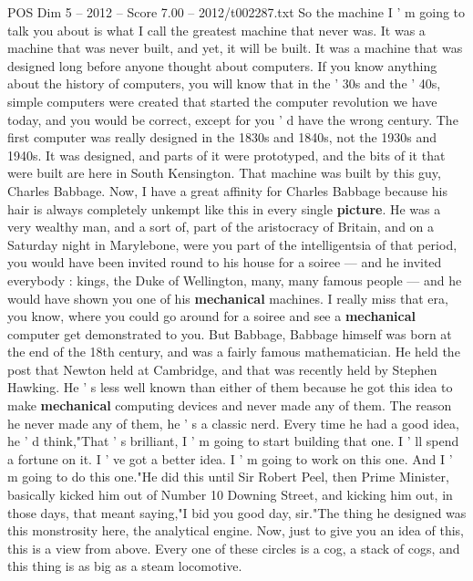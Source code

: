 \begin{textsample}{POS Dim 5 – 2012 – Score 7.00 – 2012/t002287.txt}  \label{ex:f5_pos_039}
So the machine I ' m going to talk you about is what I call the greatest machine that never was.
It was a machine that was never built, and yet, it will be built.
It was a machine that was designed long before anyone thought about computers.
If you know anything about the history of computers, you will know that in the ' 30s and the ' 40s, simple computers were created that started the computer revolution we have today, and you would be correct, except for you ' d have the wrong century.
The first computer was really designed in the 1830s and 1840s, not the 1930s and 1940s.
It was designed, and parts of it were prototyped, and the bits of it that were built are here in South Kensington.
That machine was built by this guy, Charles Babbage.
Now, I have a great affinity for Charles Babbage because his hair is always completely unkempt like this in every single \textbf{picture}.
He was a very wealthy man, and a sort of, part of the aristocracy of Britain, and on a Saturday night in Marylebone, were you part of the intelligentsia of that period, you would have been invited round to his house for a soiree — and he invited everybody : kings, the Duke of Wellington, many, many famous people — and he would have shown you one of his \textbf{mechanical} machines.
I really miss that era, you know, where you could go around for a soiree and see a \textbf{mechanical} computer get demonstrated to you.
But Babbage, Babbage himself was born at the end of the 18th century, and was a fairly famous mathematician.
He held the post that Newton held at Cambridge, and that was recently held by Stephen Hawking.
He ' s less well known than either of them because he got this idea to make \textbf{mechanical} computing devices and never made any of them.
The reason he never made any of them, he ' s a classic nerd.
Every time he had a good idea, he ' d think,"That ' s brilliant, I ' m going to start building that one.
I ' ll spend a fortune on it.
I ' ve got a better idea.
I ' m going to work on this one.
And I ' m going to do this one."He did this until Sir Robert Peel, then Prime Minister, basically kicked him out of Number 10 Downing Street, and kicking him out, in those days, that meant saying,"I bid you good day, sir."The thing he designed was this monstrosity here, the analytical engine.
Now, just to give you an idea of this, this is a view from above.
Every one of these circles is a cog, a stack of cogs, and this thing is as big as a steam locomotive.

\end{textsample}

